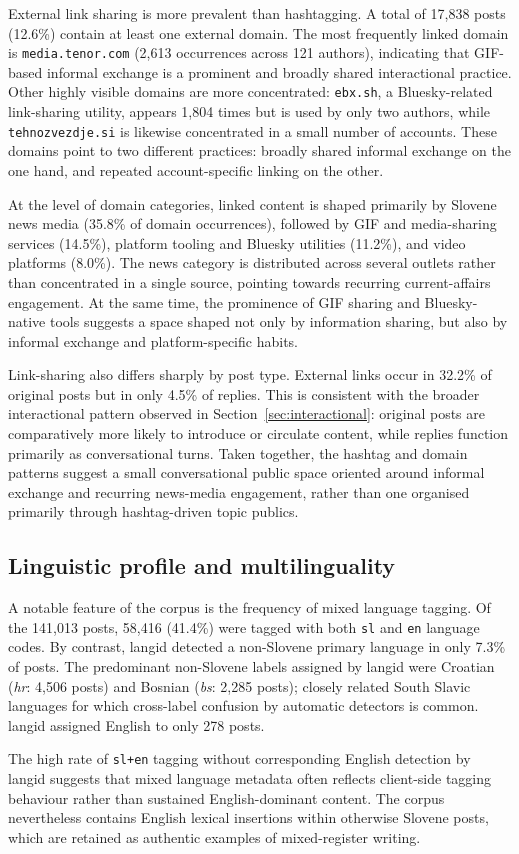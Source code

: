 External link sharing is more prevalent than hashtagging. A total of 17,838 posts (12.6\%) contain at least one external domain. The most frequently linked domain is \texttt{media.tenor.com} (2,613 occurrences across 121 authors), indicating that GIF-based informal exchange is a prominent and broadly shared interactional practice. Other highly visible domains are more concentrated: \texttt{ebx.sh}, a Bluesky-related link-sharing utility, appears 1,804 times but is used by only two authors, while \texttt{tehnozvezdje.si} is likewise concentrated in a small number of accounts. These domains point to two different practices: broadly shared informal exchange on the one hand, and repeated account-specific linking on the other.

At the level of domain categories, linked content is shaped primarily by Slovene news media (35.8\% of domain occurrences), followed by GIF and media-sharing services (14.5\%), platform tooling and Bluesky utilities (11.2\%), and video platforms (8.0\%). The news category is distributed across several outlets rather than concentrated in a single source, pointing towards recurring current-affairs engagement. At the same time, the prominence of GIF sharing and Bluesky-native tools suggests a space shaped not only by information sharing, but also by informal exchange and platform-specific habits.

Link-sharing also differs sharply by post type. External links occur in 32.2\% of original posts but in only 4.5\% of replies. This is consistent with the broader interactional pattern observed in Section~\ref{sec:interactional}: original posts are comparatively more likely to introduce or circulate content, while replies function primarily as conversational turns. Taken together, the hashtag and domain patterns suggest a small conversational public space oriented around informal exchange and recurring news-media engagement, rather than one organised primarily through hashtag-driven topic publics.

\subsection{Linguistic profile and multilinguality}

A notable feature of the corpus is the frequency of mixed language tagging. Of the 141,013 posts, 58,416 (41.4\%) were tagged with both \texttt{sl} and \texttt{en} language codes. By contrast, langid detected a non-Slovene primary language in only 7.3\% of posts. The predominant non-Slovene labels assigned by langid were Croatian (\textit{hr}: 4,506 posts) and Bosnian (\textit{bs}: 2,285 posts); closely related South Slavic languages for which cross-label confusion by automatic detectors is common. langid assigned English to only 278 posts.

The high rate of \texttt{sl+en} tagging without corresponding English detection by langid suggests that mixed language metadata often reflects client-side tagging behaviour rather than sustained English-dominant content. The corpus nevertheless contains English lexical insertions within otherwise Slovene posts, which are retained as authentic examples of mixed-register writing.

